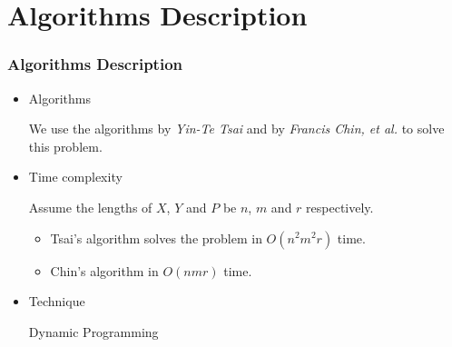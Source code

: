 \documentclass[10pt]{beamer}
\begin{document}
\section{Algorithms Description}
\begin{frame}
  \frametitle{Algorithms Description}

  \begin{itemize}
    \item<1-> Algorithms

  We use the algorithms by \emph{Yin-Te Tsai} and by \emph{Francis Chin, et al.} to solve this problem.

    \vskip15pt

    \item<2-> Time complexity

  Assume the lengths of $X$, $Y$ and $P$ be $n$, $m$ and $r$ respectively. 
  \begin{itemize}
    \item Tsai's algorithm solves the problem in $O(n^2m^2 r)$ time.
    \item Chin's algorithm in $O(nmr)$ time.
  \end{itemize}

    \vskip15pt
    \item<3-> Technique

    Dynamic Programming

  \end{itemize}

\end{frame}
\end{document}
